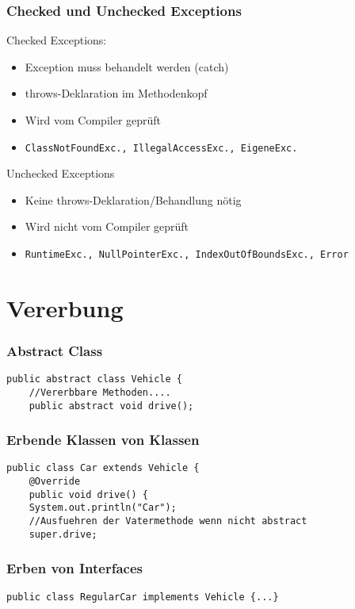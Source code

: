 \begin{multicols*}{5}
		\subsubsection{Checked und Unchecked Exceptions}
		\textcolor{b}{Checked Exceptions:}
		\begin{itemize}
			\item Exception muss behandelt werden (catch)
			\item throws-Deklaration im Methodenkopf
			\item Wird vom Compiler geprüft
			\item \tiny \texttt{ClassNotFoundExc., IllegalAccessExc., EigeneExc.}
		\end{itemize}
		\textcolor{b}{Unchecked Exceptions}
		\begin{itemize}
			\item Keine throws-Deklaration/Behandlung nötig
			\item Wird nicht vom Compiler geprüft
			\item \tiny \texttt{RuntimeExc., NullPointerExc., IndexOutOfBoundsExc., Error}
		\end{itemize}
		
	
\section{Vererbung}
	\subsubsection{Abstract Class}
	\begin{lstlisting}
public abstract class Vehicle {
	//Vererbbare Methoden....
	public abstract void drive();
	\end{lstlisting}
	\subsubsection{Erbende Klassen von Klassen}
	\begin{lstlisting}
public class Car extends Vehicle {
	@Override
	public void drive() {
	System.out.println("Car");
	//Ausfuehren der Vatermethode wenn nicht abstract
	super.drive; 
	\end{lstlisting}
	\subsubsection{Erben von Interfaces}
	\begin{lstlisting}
public class RegularCar implements Vehicle {...}
	\end{lstlisting}



\end{multicols*}
